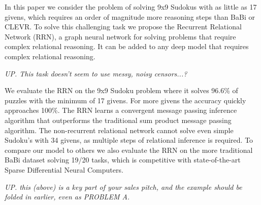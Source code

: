 In this paper we consider the problem of solving 9x9 Sudokus with as little as 17 givens, which requires an order of magnitude more reasoning steps than BaBi or CLEVR. To solve this challenging task we propose the Recurrent Relational Network (RRN), a graph neural network for solving problems that require complex relational reasoning. It can be added to any deep model that requires complex relational reasoning.

\emph{UP. This task doesn't seem to use messy, noisy censors...?}

We evaluate the RRN on the 9x9 Sudoku problem where it solves 96.6\% of puzzles with the minimum of 17 givens. For more givens the accuracy quickly approaches 100\%. The RRN learns a convergent message passing inference algorithm that outperforms the traditional sum product message passing algorithm.
The non-recurrent relational network cannot solve even simple Sudoku's with 34 givens, as multiple steps of relational inference is required. To compare our model to others we also evaluate the RRN on the more traditional BaBi dataset solving 19/20 tasks, which is competitive with state-of-the-art Sparse Differential Neural Computers.

\emph{UP. this (above) is a key part of your sales pitch, and the example should be folded in earlier, even as PROBLEM A.}
